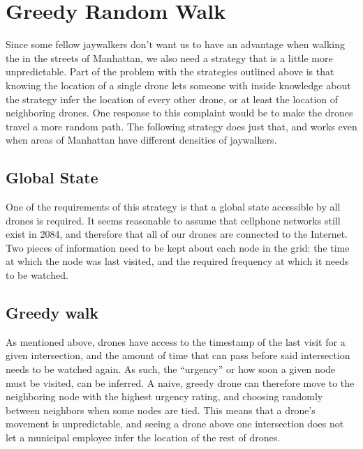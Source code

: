 \documentclass{article}
\begin{document}
\section{Greedy Random Walk}
\label{sec:greedy_random_walk_model}
Since some fellow jaywalkers don't want us to have an advantage when walking the in the streets of Manhattan, we also need a strategy that is a little more unpredictable. Part of the problem with the strategies outlined above is that knowing the location of a single drone lets someone with inside knowledge about the strategy infer the location of every other drone, or at least the location of neighboring drones. One response to this complaint would be to make the drones travel a more random path. The following strategy does just that, and works even when areas of Manhattan have different densities of jaywalkers.

\subsection{Global State}
\label{sub:global_state}
One of the requirements of this strategy is that a global state accessible by all drones is required. It seems reasonable to assume that cellphone networks still exist in 2084, and therefore that all of our drones are connected to the Internet. Two pieces of information need to be kept about each node in the grid: the time at which the node was last visited, and the required frequency at which it needs to be watched.

\subsection{Greedy walk}
\label{sub:greedy_walk}
As mentioned above, drones have access to the timestamp of the last visit for a given intersection, and the amount of time that can pass before said intersection needs to be watched again. As such, the ``urgency'' or how soon a given node must be visited, can be inferred. A naive, greedy drone can therefore move to the neighboring node with the highest urgency rating, and choosing randomly between neighbors when some nodes are tied. This means that a drone’s movement is unpredictable, and seeing a drone above one intersection does not let a municipal employee infer the location of the rest of drones.
\end{document}
